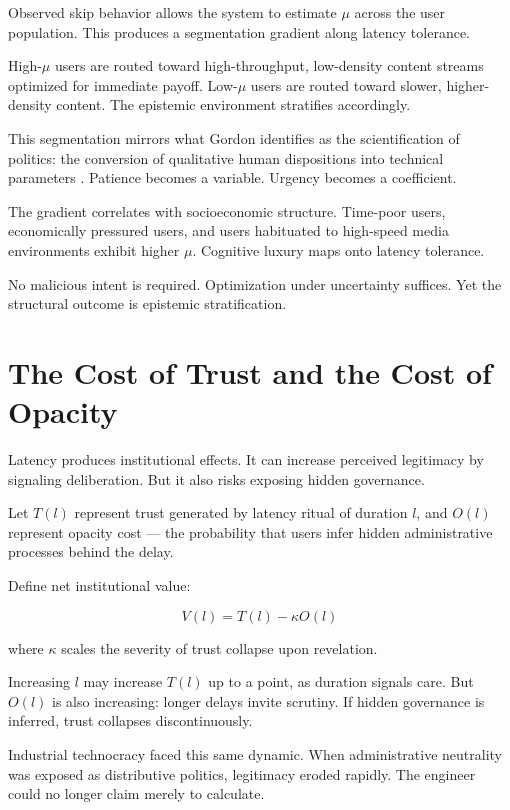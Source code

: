 \documentclass[12pt]{article}
\begin{document}
Observed skip behavior allows the system to estimate $\mu$ across the user population. This produces a segmentation gradient along latency tolerance.

High-$\mu$ users are routed toward high-throughput, low-density content streams optimized for immediate payoff. Low-$\mu$ users are routed toward slower, higher-density content. The epistemic environment stratifies accordingly.

This segmentation mirrors what Gordon identifies as the scientification of politics: the conversion of qualitative human dispositions into technical parameters \cite{GordonTechnocracy2025}. Patience becomes a variable. Urgency becomes a coefficient.

The gradient correlates with socioeconomic structure. Time-poor users, economically pressured users, and users habituated to high-speed media environments exhibit higher $\mu$. Cognitive luxury maps onto latency tolerance.

No malicious intent is required. Optimization under uncertainty suffices. Yet the structural outcome is epistemic stratification.

\section{The Cost of Trust and the Cost of Opacity}

Latency produces institutional effects. It can increase perceived legitimacy by signaling deliberation. But it also risks exposing hidden governance.

Let $T(l)$ represent trust generated by latency ritual of duration $l$, and $O(l)$ represent opacity cost — the probability that users infer hidden administrative processes behind the delay.

Define net institutional value:

\[
V(l) = T(l) - \kappa O(l)
\]

where $\kappa$ scales the severity of trust collapse upon revelation.

Increasing $l$ may increase $T(l)$ up to a point, as duration signals care. But $O(l)$ is also increasing: longer delays invite scrutiny. If hidden governance is inferred, trust collapses discontinuously.

Industrial technocracy faced this same dynamic. When administrative neutrality was exposed as distributive politics, legitimacy eroded rapidly. The engineer could no longer claim merely to calculate.
\end{document}
